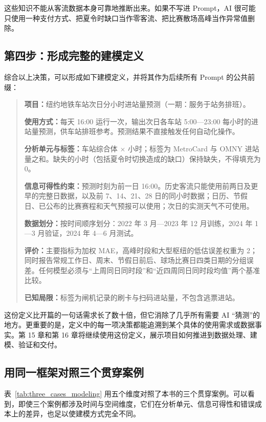 这些知识不能从客流数据本身可靠地推断出来。如果不写进 Prompt，AI 很可能只使用一种支付方式、把夏令时缺口当作零客流、把比赛散场高峰当作异常值删除。

\subsection{第四步：形成完整的建模定义}

综合以上决策，可以形成如下建模定义，并将其作为后续所有 Prompt 的公共前缀：

\begin{quote}
\textbf{项目：}纽约地铁车站次日分小时进站量预测（一期：服务于站务排班）。

\textbf{使用方式：}每天 16:00 运行一次，输出次日各车站 5:00—23:00 每小时的进站量预测，供车站排班参考。预测结果不直接触发任何自动化操作。

\textbf{分析单元与标签：}车站综合体 $\times$ 小时；标签为 MetroCard 与 OMNY 进站量之和。缺失的小时（包括夏令时切换造成的缺口）保持缺失，不得填充为 0。

\textbf{信息可得性约束：}预测时刻为前一日 16:00。历史客流只能使用前两日及更早的完整日数据，以及前 7、14、21、28 日的同小时数据；日历、节假日、已公布的比赛赛程和天气预报可以使用；次日的实测天气不可使用。

\textbf{数据划分：}按时间顺序划分：2022 年 3 月—2023 年 12 月训练，2024 年 1—3 月验证，2024 年 4—6 月测试。

\textbf{评价：}主要指标为加权 MAE，高峰时段和大型枢纽的低估误差权重为 2；同时报告常规工作日、周末、节假日前后、球场比赛日四类日期的分组误差。任何模型必须与“上周同日同时段”和“近四周同日同时段均值”两个基准比较。

\textbf{已知局限：}标签为闸机记录的刷卡与扫码进站量，不包含逃票进站。
\end{quote}

这份定义比开篇的一句话需求长了数十倍，但它消除了几乎所有需要 AI “猜测”的地方。更重要的是，定义中的每一项决策都能追溯到某个具体的使用需求或数据事实。第 15 章和第 16 章将继续使用这份定义，展示项目如何推进到数据处理、建模、验证和交付。

\subsection{用同一框架对照三个贯穿案例}

表~\ref{tab:three_cases_modeling} 用五个维度对照了本书的三个贯穿案例。可以看到，即使三个案例都涉及时间与空间维度，它们在分析单元、信息可得性和错误成本上的差异，也足以使建模方式完全不同。


